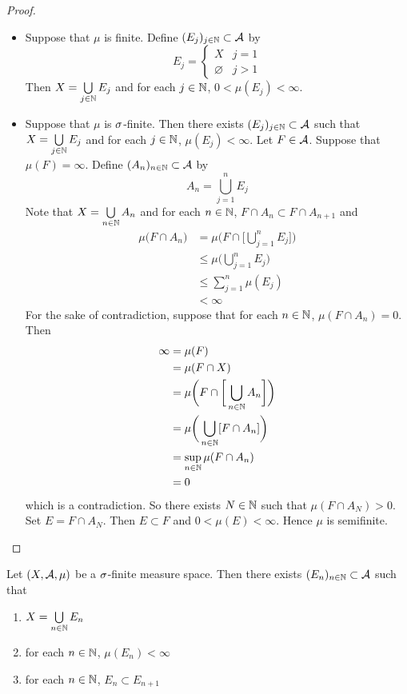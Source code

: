\documentclass{book}
\begin{document}
	\begin{proof}\
		\begin{itemize}
			\item Suppose that $\mu$ is finite. Define $(E_j)_{j \in \mathbb{N}} \subset \mathcal{A}$ by 
			\[E_j =
			\begin{cases}
				X & j=1 \\
				\varnothing & j > 1
			\end{cases}
			\]
			Then $X = \bigcup\limits_{j \in \mathbb{N}} E_j$ and for each $j \in \mathbb{N}$, $0 < \mu(E_j) < \infty$.
			\item Suppose that $\mu$ is $\sigma$-finite. Then there exists $(E_j)_{j \in \mathbb{N}} \subset \mathcal{A}$ such that $X = \bigcup\limits_{j \in \mathbb{N}} E_j$
			and for each $j \in \mathbb{N}$, $\mu(E_j) < \infty$. Let $F \in \mathcal{A}$. Suppose that $\mu(F) = \infty$. Define $(A_n)_{n \in \mathbb{N}} \subset \mathcal{A}$ by 
			$$A_n = \bigcup_{j=1}^n E_j$$
			Note that $X = \bigcup\limits_{n \in \mathbb{N}} A_n$ and for each $n \in \mathbb{N}$, $F \cap A_n \subset F \cap A_{n+1}$ and 
			\begin{align*}
				\mu \bigg (F \cap A_n \bigg)  
				& = \mu \bigg (F \cap \bigg[ \bigcup_{j=1}^n E_j \bigg] \bigg)  \\
				& \leq \mu \bigg (\bigcup_{j=1}^n E_j \bigg) \\
				& \leq \sum_{j=1}^n \mu(E_j) \\
				& < \infty
			\end{align*}
			For the sake of contradiction, suppose that for each $n \in \mathbb{N}$, $\mu  (F \cap A_n ) = 0$. Then
			\begin{align*}
				\infty 
				& = \mu(F) \\
				& = \mu(F \cap X) \\
				& = \mu\bigg(F \cap \bigg[ \bigcup_{n \in \mathbb{N}} A_n \bigg] \bigg) \\
				& = \mu\bigg(  \bigcup_{n \in \mathbb{N}} [F \cap A_n] \bigg) \\
				& = \sup_{n \in \mathbb{N}} \mu(F \cap A_n) \\
				& = 0
			\end{align*}
			which is a contradiction. So there exists $N \in \mathbb{N}$ such that $\mu  (F \cap A_N ) > 0$. Set $E = F \cap A_N$. Then $E \subset F$ and $0 < \mu(E) < \infty$. Hence $\mu$ is semifinite.
		\end{itemize}
	\end{proof}

	\begin{ex} 
		Let $(X, \mathcal{A}, \mu)$ be a $\sigma$-finite measure space. Then there exists $(E_n)_{n \in \mathbb{N}} \subset \mathcal{A}$ such that 
		\begin{enumerate}
			\item $X = \bigcup\limits_{n \in \mathbb{N}} E_n$
			\item for each $n \in \mathbb{N}$, $\mu(E_n) < \infty$ 
			\item for each $n \in \mathbb{N}$, $E_n \subset E_{n+1}$
		\end{enumerate}
	\end{ex}
\end{document}
